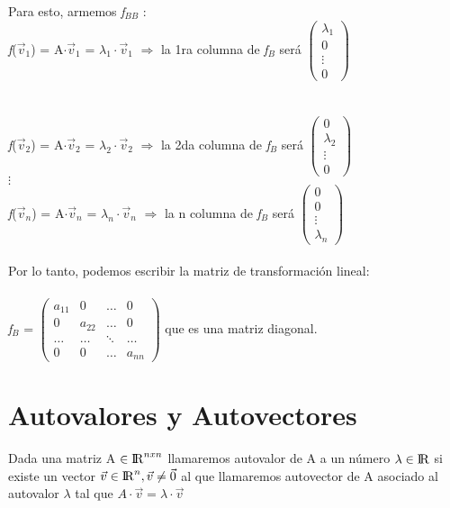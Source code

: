 \documentclass[11pt]{article}
\begin{document}
Para esto, armemos \textbardbl \textit{f}\textbardbl $_{BB}$ :\\
\textit{f}($\vec{v}_{1}$) = A$\cdot\vec{v}_1$ = $\lambda_{1}\cdot\vec{v}_{1}$ $\Rightarrow$ la 1ra columna de \textbardbl \textit{f}\textbardbl $_{B}$ será {}$ \begin{pmatrix} \lambda_{1}\\ 0\\ \vdots\\ 0 \end{pmatrix}$\\\\\\
\textit{f}($\vec{v}_{2}$) = A$\cdot\vec{v}_2$ = $\lambda_{2}\cdot\vec{v}_{2}$ $\Rightarrow$ la 2da columna de \textbardbl \textit{f}\textbardbl $_{B}$ será $ \begin{pmatrix} 0 \\ \lambda_{2}\\ \vdots\\ 0 \end{pmatrix}$\\
$\vdots$\\
\textit{f}($\vec{v}_{n}$) = A$\cdot\vec{v}_n$ = $\lambda_{n}\cdot\vec{v}_{n}$ $\Rightarrow$ la n columna de \textbardbl \textit{f}\textbardbl $_{B}$ será {  } $ \begin{pmatrix} 0 \\ 0\\ \vdots\\ \lambda_n \end{pmatrix}$\\\\
Por lo tanto, podemos escribir la matriz de transformación lineal:\\\\
 \textbardbl \textit{f}\textbardbl $_{B}$ = $ \begin{pmatrix} a_{11}&0&\ldots&0\\ 0&a_{22}&\ldots&0\\ \ldots&\ldots&\ddots&\ldots\\ 0&0&\ldots&a_{nn} \end{pmatrix}$ que es una matriz diagonal. \\
\newpage
\section{Autovalores y Autovectores}
Dada una matriz A $\in {\rm I\!R}^{nxn}$ llamaremos autovalor de A a un número $\lambda \in {\rm I\!R}$ si existe un vector $\vec{v} \in {\rm I\!R}^n, \vec{v} \neq \vec{0}$ al que llamaremos autovector de A asociado al autovalor $\lambda$ tal que $A\cdot\vec{v} = \lambda\cdot\vec{v}$
\end{document}

